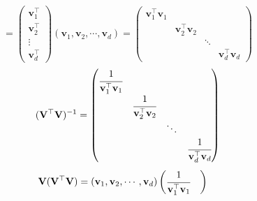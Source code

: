 \documentclass[11pt,letter,notitlepage]{article}
\begin{document}
\begin{solution}
\begin{enumerate}
\begin{enumerate}
\begin{enumerate}
$$					                  =\begin{pmatrix}
						                  \mathbf{v}_1^\top \\ \mathbf{v}_2^\top \\ \vdots \\\mathbf{v}_d^\top
					                  \end{pmatrix}
					                  \left( \mathbf{v}_1, \mathbf{v}_2, \cdots, \mathbf{v}_d \right)
					                  =\begin{pmatrix}
						                  \mathbf{v}_1^\top\mathbf{v}_1 &                                                                        \\
						                                                & \mathbf{v}_2^\top\mathbf{v}_2                                          \\
						                                                &                               & \ddots                                 \\
						                                                &                               &        & \mathbf{v}_d^\top\mathbf{v}_d
					                  \end{pmatrix}$$
				                  $$(\mathbf{V}^\top \mathbf{V})^{-1}
					                  =\begin{pmatrix}
						                  \cfrac{1}{\mathbf{v}_1^\top\mathbf{v}_1} &                                                                                               \\
						                                                           & \cfrac{1}{\mathbf{v}_2^\top\mathbf{v}_2 }                                                     \\
						                                                           &                                           & \ddots                                            \\
						                                                           &                                           &        & \cfrac{1}{\mathbf{v}_d^\top\mathbf{v}_d}
					                  \end{pmatrix}$$
				                  $$\begin{aligned}
						                  \mathbf{V}(\mathbf{V}^\top \mathbf{V})
						                   & = \left( \mathbf{v}_1, \mathbf{v}_2, \cdots, \mathbf{v}_d \right)
						                  \begin{pmatrix}
							                  \cfrac{1}{\mathbf{v}_1^\top\mathbf{v}_1} &                                                                                               \\

\end{pmatrix}
\end{aligned}$$
\end{enumerate}
\end{enumerate}
\end{enumerate}
\end{solution}
\end{document}
